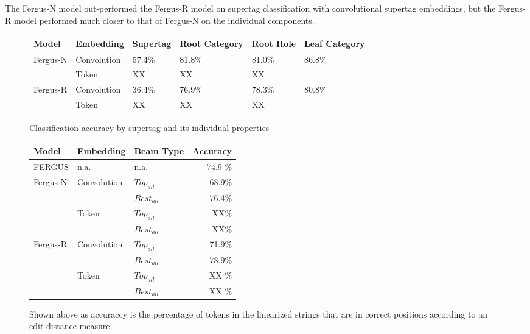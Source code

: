 \documentclass[11pt]{article}
\begin{document}
The Fergus-N model out-performed the Fergus-R model on supertag classification with convolutional supertag embeddings, but the Fergus-R model performed much closer to that of Fergus-N on the individual components. 


\begin{figure}
\centering
\begin{tabular}{|l|p{2cm}|p{2cm}|p{2.3cm}|p{2cm}|p{2.3cm}|}
\hline
Model & Embedding & Supertag & Root Category & Root Role & Leaf Category  \\ \hline
Fergus-N &  Convolution &  57.4\% & 81.8\% & 81.0\% & 86.8\% \\ \cline{2-6}
         &  Token       &  XX & XX & XX & \\ \cline{2-6}
\hline
Fergus-R &  Convolution &  36.4\% & 76.9\% & 78.3\% & 80.8\% \\ \cline{2-6}
         &  Token       &  XX & XX & XX & \\ \cline{2-6}
\hline
\end{tabular}
\label{table:accresults}
\caption{Classification accuracy by supertag and its individual properties}
\end{figure}

\begin{figure}
\centering
\begin{tabular}{|l|p{2cm}|p{1.5cm}|r|}
\hline
Model & Embedding & Beam Type & Accuracy \\ \hline
FERGUS & n.a. & n.a. & 74.9 \% \\
\hline \hline
Fergus-N & Convolution & $Top_{all}$  & 68.9\% \\ \cline{3-4}
         &             & $Best_{all}$ & 76.4\% \\ \cline{2-4}
         & Token       & $Top_{all}$  & XX\% \\ \cline{3-4}
         &             & $Best_{all}$ & XX\% \\ \cline{3-4}
\hline
Fergus-R & Convolution & $Top_{all}$  & 71.9\% \\ \cline{3-4}
         &             & $Best_{all}$ & 78.9\% \\ \cline{2-4}
         & Token       & $Top_{all}$  & XX \% \\ \cline{3-4}
         &             & $Best_{all}$ & XX \% \\ \cline{3-4}
\hline
\end{tabular}
\label{table:linresults}
\caption{Shown above as accuraccy is the percentage of tokens in the linearized strings that are in correct positions according to an edit distance measure.}
\end{figure}
\end{document}
